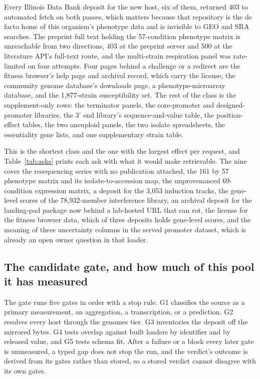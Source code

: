  Every Illinois Data Bank deposit for the new host, six
of them, returned 403 to automated fetch on both passes, which matters because that repository
is the de facto home of this organism's phenotype data and is invisible to GEO and SRA
searches. The preprint full text holding the 57-condition phenotype matrix is unreachable from
two directions, 403 at the preprint server and 500 at the literature API's full-text route, and
the multi-strain respiration panel was rate-limited on four attempts. Four pages behind a
challenge or a redirect are the fitness browser's help page and archival record, which carry
the license, the community genome database's downloads page, a phenotype-microarray database,
and the 1,877-strain susceptibility set. The rest of the class is the supplement-only rows: the
terminator panels, the core-promoter and designed-promoter libraries, the 3' end library's
sequence-and-value table, the position-effect tables, the two aneuploid panels, the two isolate
spreadsheets, the essentiality gene lists, and one supplementary strain table.

 This is the shortest class and the one with
the largest effect per request, and Table~\ref{tab:asks} prints each ask with what it would
make retrievable. The nine cover the resequencing series with no publication attached, the 161
by 57 phenotype matrix and its isolate-to-accession map, the unprovenanced 69-condition
expression matrix, a deposit for the 3,053 induction tracks, the gene-level scores of the
78,932-member interference library, an archival deposit for the landing-pad package now behind
a lab-hosted URL that can rot, the license for the fitness browser data, which of three
deposits holds gene-level scores, and the meaning of three uncertainty columns in the served
promoter dataset, which is already an open owner question in that loader.



\subsection{The candidate gate, and how much of this pool it has measured}\label{sec:ungated}

The gate runs five gates in order with a stop rule. G1 classifies the source as a primary
measurement, an aggregation, a transcription, or a prediction. G2 resolves every host through
the genomes tier. G3 inventories the deposit off the mirrored bytes. G4 tests overlap against
built loaders by identifier and by released value, and G5 tests schema fit. After a failure or
a block every later gate is unmeasured, a typed gap does not stop the run, and the verdict's
outcome is derived from its gates rather than stored, so a stored verdict cannot disagree with
its own gates.

